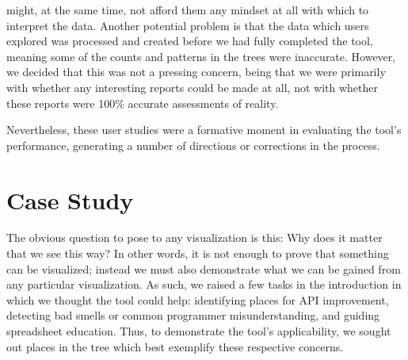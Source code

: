 \documentclass[conference]{IEEEtran}
\begin{document}
might, at the same time, not afford them any mindset at all with which to 
interpret the data. Another potential problem is that the data which users
explored was processed and created before we had fully completed the tool,
meaning some of the counts and patterns in the trees were inaccurate. 
However, we decided that this was not a pressing concern, being that we 
were primarily with whether any interesting reports could be made at all, 
not with whether these reports were 100\% accurate assessments of reality. \par
Nevertheless, these user studies were a formative moment in evaluating
the tool's performance, generating a number of directions or corrections
in the process.
\section{Case Study}
The obvious question to pose to any visualization is this: Why does it matter that we see this way? In other words, it is not enough to prove that something can be visualized; instead we must also demonstrate what we can be gained from any particular visualization. As such, we raised a few tasks in the introduction in which we thought the tool could help: identifying places for API improvement, detecting bad smells or common programmer misunderstanding, and guiding spreadsheet education. Thus, to demonstrate the tool's applicability, we sought out places in the tree which best exemplify these respective concerns.
\end{document}
